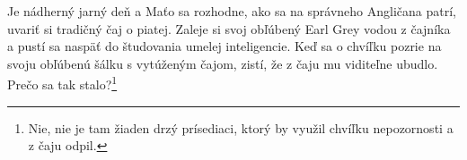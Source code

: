 Je nádherný jarný deň a Maťo sa rozhodne, ako sa na správneho Angličana
patrí, uvariť si tradičný čaj o piatej. Zaleje si svoj obľúbený Earl
Grey vodou z čajníka a pustí sa naspäť do študovania umelej
inteligencie. Keď sa o chvíľku pozrie na svoju obľúbenú šálku s
vytúženým čajom, zistí, že z čaju mu viditeľne ubudlo. Prečo sa tak
stalo?\footnote{Nie, nie je tam žiaden drzý prísediaci, ktorý by využil
  chvíľku nepozornosti a z čaju odpil.}
